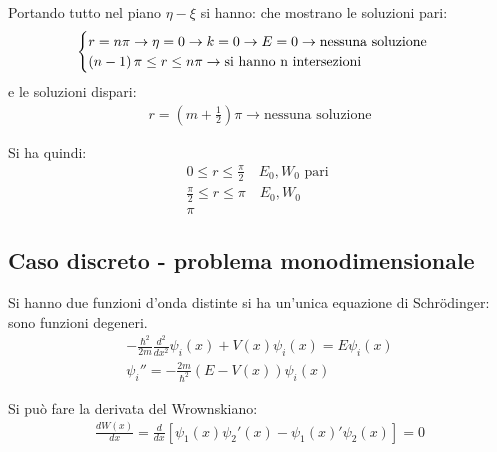 Portando tutto nel piano $\eta-\xi$ si hanno:
che mostrano le soluzioni pari:
\begin{equation}\begin{split}
\begin{cases}
r=n\pi \rightarrow \eta=0 \rightarrow k=0 \rightarrow E=0 \rightarrow \textrm{nessuna soluzione} \\
\left(n-1\right)\pi\le r \le n\pi \rightarrow \textrm{si hanno }$n$ \textrm{ intersezioni}
\end{cases}
\end{split}\end{equation}
e le soluzioni dispari:
\begin{equation}\begin{split}
r=\left(m+\frac{1}{2}\right)\pi \rightarrow \textrm{nessuna soluzione}
\end{split}\end{equation}

Si ha quindi:
\begin{equation}\begin{split}
0\le r \le \frac{\pi}{2} \quad E_0, W_0 \textrm{ pari} \\
\frac{\pi}{2} \le r \le \pi \quad E_0,W_0 \textrm{ } \quad \textrm{ } \\
\pi
\end{split}\end{equation}

\subsection{Caso discreto - problema monodimensionale} %
Si hanno due funzioni d'onda distinte si ha un'unica equazione di Schrödinger: sono funzioni degeneri.
\begin{equation}\begin{split}
-\frac{\hbar ^2}{2m}\frac{d^2}{dx^2}\psi_i\left(x\right) +V\left(x\right)\psi_i\left(x\right) =E\psi _i\left(x\right) \\
\psi_i ''=-\frac{2m}{\hbar ^2}\left(E-V\left(x\right)\right)\psi _i\left(x\right)
\end{split}\end{equation}

Si può fare la derivata del Wrownskiano:
\begin{equation}\begin{split}
\frac{dW\left(x\right)}{dx}=\frac{d}{dx}\left[\psi _1\left(x\right)\psi _2'\left(x\right)-\psi _1\left(x\right)'\psi _2\left(x\right)\right]=0
\end{split}\end{equation}


